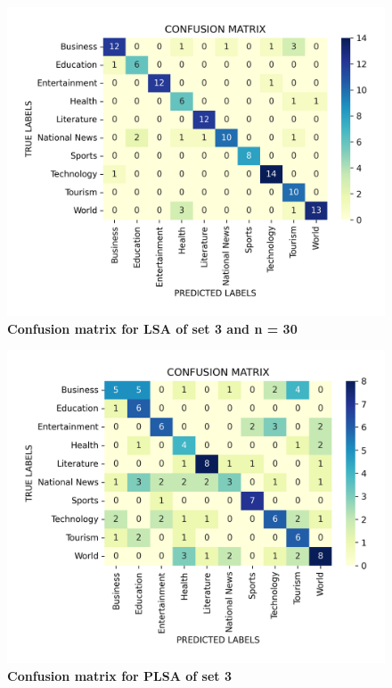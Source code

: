 \documentclass[12pt]{report}
\begin{document}
            \begin{figure}[h]
                \centering
                \includegraphics{LSA_3_30.png}
                \caption{\textbf{Confusion matrix for LSA of set 3 and n = 30}}
            \end{figure}
            \begin{figure}[h]
                \centering
                \includegraphics{PLSA_3.png}
                \caption{\textbf{Confusion matrix for PLSA of set 3}}
            \end{figure}
\end{document}

